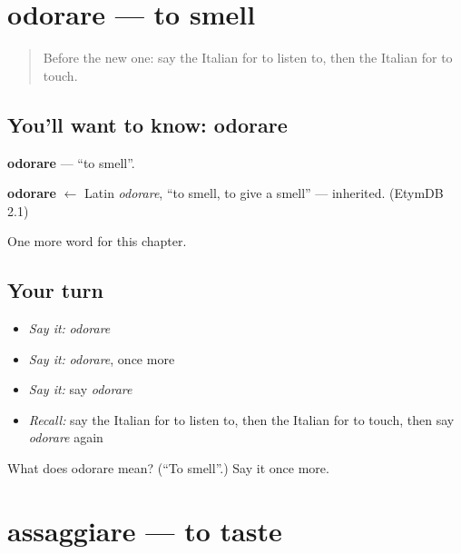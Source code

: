 \section[odorare]{odorare — to smell}

\label{lesson:IT-C176-odorare}



\begin{quote}
Before the new one: say the Italian for to listen to, then the Italian for to touch.
\end{quote}

\subsection*{You'll want to know: odorare}
\textbf{odorare} — \textquotedblleft{}to smell\textquotedblright{}.

\begin{cousinweb}
\textbf{odorare} $\leftarrow$ Latin \emph{odorare}, \textquotedblleft{}to smell, to give a smell\textquotedblright{} — inherited. (EtymDB 2.1)
\end{cousinweb}

\begin{grammarlens}[title={What you've built}]
One more word for this chapter.
\end{grammarlens}

\subsection*{Your turn}
\begin{itemize}
\raggedright
  \item \emph{Say it:} \emph{odorare}
  \item \emph{Say it:} \emph{odorare}, once more
  \item \emph{Say it:} say \emph{odorare}
  \item \emph{Recall:} say the Italian for to listen to, then the Italian for to touch, then say \emph{odorare} again
\end{itemize}

\begin{tcolorbox}[breakable,colback=teal!4,colframe=teal!35!black,title={Before you move on}]
What does odorare mean? (\textquotedblleft{}To smell\textquotedblright{}.) Say it once more.
\end{tcolorbox}
\section[assaggiare]{assaggiare — to taste}


